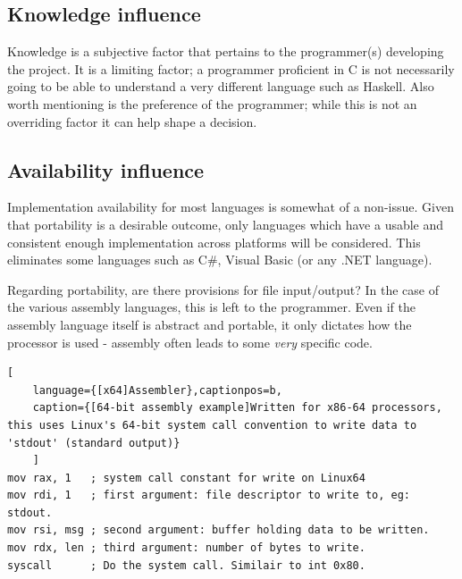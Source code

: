 \documentclass[10pt,a4paper,notitlepage]{report}
\begin{document}
\subsection{Knowledge influence}
Knowledge is a subjective factor that pertains to the programmer(s) developing the project. It is a limiting factor; a programmer proficient in C is not necessarily going to be able to understand a very different language such as Haskell. Also worth mentioning is the preference of the programmer; while this is not an overriding factor it can help shape a decision.

\subsection{Availability influence}
Implementation availability for most languages is somewhat of a non-issue. Given that portability is a desirable outcome, only languages which have a usable and consistent enough implementation across platforms will be considered. This eliminates some languages such as C\#, Visual Basic (or any .NET language).

Regarding portability, are there provisions for file input/output? In the case of the various assembly languages, this is left to the programmer. Even if the assembly language itself is abstract and portable, it only dictates how the processor is used - assembly often leads to some \emph{very} specific code.

\begin{lstlisting}[
	language={[x64]Assembler},captionpos=b,
	caption={[64-bit assembly example]Written for x86-64 processors, this uses Linux's 64-bit system call convention to write data to 'stdout' (standard output)}
	]
mov rax, 1   ; system call constant for write on Linux64
mov rdi, 1   ; first argument: file descriptor to write to, eg: stdout.
mov rsi, msg ; second argument: buffer holding data to be written.
mov rdx, len ; third argument: number of bytes to write.
syscall      ; Do the system call. Similair to int 0x80.
\end{lstlisting}
\end{document}
